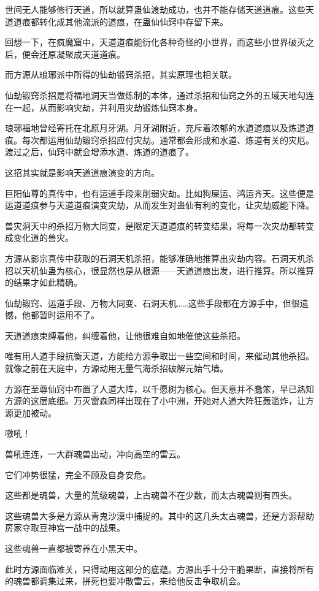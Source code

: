 \begin{this_body}
世间无人能够修行天道，所以就算蛊仙渡劫成功，也并不能存储天道道痕。这些天道道痕都转化成其他流派的道痕，在蛊仙仙窍中存留下来。

回想一下，在疯魔窟中，天道道痕能衍化各种奇怪的小世界，而这些小世界破灭之后，便会还原凝聚成天道道痕。

而方源从琅琊派中所得的仙劫锻窍杀招，其实原理也相关联。

仙劫锻窍杀招是将福地洞天当做炼制的本体，通过杀招和仙窍之外的五域天地勾连在一起，从而影响灾劫，并利用灾劫锻炼仙窍本身。

琅琊福地曾经寄托在北原月牙湖。月牙湖附近，充斥着浓郁的水道道痕以及炼道道痕。每次都运用仙劫锻窍杀招应付灾劫。通常都会形成和水道、炼道有关的灾厄。渡过之后，仙窍中就会增添水道、炼道的道痕了。

这招其实就是影响天道道痕演变的方向。

巨阳仙尊的真传中，也有运道手段来削弱灾劫。比如狗屎运、鸿运齐天。这些便是运道道痕参与天道道痕演变灾劫，从而发生对蛊仙有利的变化，让灾劫威能下降。

兽灾洞天中的杀招万物大同变，是限定天道道痕的转变结果，将每一次灾劫都转变成变化道的兽灾。

方源从影宗真传中获取的石洞天机杀招，能够准确地推算出灾劫内容。石洞天机杀招以天机仙蛊为核心，很显然也是从根源——天道道痕出发，进行推算。所以推算的结果才如此精确。

仙劫锻窍、运道手段、万物大同变、石洞天机……这些手段都在方源手中，但很遗憾，他都暂时运用不了。

天道道痕束缚着他，纠缠着他，让他很难自如地催使这些杀招。

唯有用人道手段抗衡天道，方能给方源争取出一些空间和时间，来催动其他杀招。就像之前在天庭中，方源动用无量气海杀招破解元始气墙。

方源在至尊仙窍中布置了人道大阵，以千愿树为核心。但天意并不蠢笨，早已熟知方源的这层底细。万灭雷森同样出现在了小中洲，开始对人道大阵狂轰滥炸，让方源更加被动。

嗷吼！

兽吼连连，一大群魂兽出动，冲向高空的雷云。

它们冲势很猛，完全不顾及自身安危。

这些都是魂兽，大量的荒级魂兽，上古魂兽不在少数，而太古魂兽则有四头。

这些魂兽大多是方源从青鬼沙漠中捕捉的。其中的这几头太古魂兽，还是方源帮助房家夺取豆神宫一战中的战果。

这些魂兽一直都被寄养在小黑天中。

此时方源面临难关，只得动用这部分的底蕴。方源出手十分干脆果断，直接将所有的魂兽都调集过来，拼死也要冲散雷云，来给他反击争取机会。


\end{this_body}
